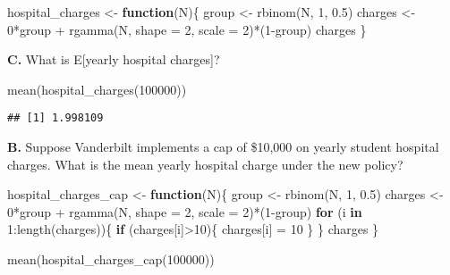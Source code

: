 \documentclass[
]{article}
\newenvironment{Shaded}{\begin{snugshade}}{\end{snugshade}}
\newcommand{\AttributeTok}[1]{\textcolor[rgb]{0.77,0.63,0.00}{#1}}
\newcommand{\ControlFlowTok}[1]{\textcolor[rgb]{0.13,0.29,0.53}{\textbf{#1}}}
\newcommand{\DecValTok}[1]{\textcolor[rgb]{0.00,0.00,0.81}{#1}}
\newcommand{\FloatTok}[1]{\textcolor[rgb]{0.00,0.00,0.81}{#1}}
\newcommand{\FunctionTok}[1]{\textcolor[rgb]{0.00,0.00,0.00}{#1}}
\newcommand{\NormalTok}[1]{#1}
\newcommand{\OtherTok}[1]{\textcolor[rgb]{0.56,0.35,0.01}{#1}}
\newcommand{\SpecialCharTok}[1]{\textcolor[rgb]{0.00,0.00,0.00}{#1}}
\begin{document}
\begin{Shaded}
\begin{Highlighting}[]
\NormalTok{hospital\_charges }\OtherTok{\textless{}{-}} \ControlFlowTok{function}\NormalTok{(N)\{}
\NormalTok{  group }\OtherTok{\textless{}{-}} \FunctionTok{rbinom}\NormalTok{(N, }\DecValTok{1}\NormalTok{, }\FloatTok{0.5}\NormalTok{)}
\NormalTok{  charges }\OtherTok{\textless{}{-}} \DecValTok{0}\SpecialCharTok{*}\NormalTok{group }\SpecialCharTok{+} \FunctionTok{rgamma}\NormalTok{(N, }\AttributeTok{shape =} \DecValTok{2}\NormalTok{, }\AttributeTok{scale =} \DecValTok{2}\NormalTok{)}\SpecialCharTok{*}\NormalTok{(}\DecValTok{1}\SpecialCharTok{{-}}\NormalTok{group)}
\NormalTok{  charges}
\NormalTok{\}}
\end{Highlighting}
\end{Shaded}

\textbf{C.} What is E{[}yearly hospital charges{]}?

\begin{Shaded}
\begin{Highlighting}[]
\FunctionTok{mean}\NormalTok{(}\FunctionTok{hospital\_charges}\NormalTok{(}\DecValTok{100000}\NormalTok{))}
\end{Highlighting}
\end{Shaded}

\begin{verbatim}
## [1] 1.998109
\end{verbatim}

\textbf{B.} Suppose Vanderbilt implements a cap of \$10,000 on yearly
student hospital charges. What is the mean yearly hospital charge under
the new policy?

\begin{Shaded}
\begin{Highlighting}[]
\NormalTok{hospital\_charges\_cap }\OtherTok{\textless{}{-}} \ControlFlowTok{function}\NormalTok{(N)\{}
\NormalTok{  group }\OtherTok{\textless{}{-}} \FunctionTok{rbinom}\NormalTok{(N, }\DecValTok{1}\NormalTok{, }\FloatTok{0.5}\NormalTok{)}
\NormalTok{  charges }\OtherTok{\textless{}{-}} \DecValTok{0}\SpecialCharTok{*}\NormalTok{group }\SpecialCharTok{+} \FunctionTok{rgamma}\NormalTok{(N, }\AttributeTok{shape =} \DecValTok{2}\NormalTok{, }\AttributeTok{scale =} \DecValTok{2}\NormalTok{)}\SpecialCharTok{*}\NormalTok{(}\DecValTok{1}\SpecialCharTok{{-}}\NormalTok{group)}
  \ControlFlowTok{for}\NormalTok{ (i }\ControlFlowTok{in} \DecValTok{1}\SpecialCharTok{:}\FunctionTok{length}\NormalTok{(charges))\{}
    \ControlFlowTok{if}\NormalTok{ (charges[i]}\SpecialCharTok{\textgreater{}}\DecValTok{10}\NormalTok{)\{}
\NormalTok{      charges[i] }\OtherTok{=} \DecValTok{10}
\NormalTok{    \}}
\NormalTok{  \}}
\NormalTok{  charges}
\NormalTok{\}}

\FunctionTok{mean}\NormalTok{(}\FunctionTok{hospital\_charges\_cap}\NormalTok{(}\DecValTok{100000}\NormalTok{))}
\end{Highlighting}
\end{Shaded}
\end{document}
